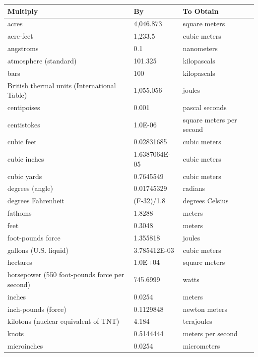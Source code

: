 \documentclass{fidata-report-template}
\begin{document}
{\footnotesize\sffamily\centering
  \begin{longtable}{||l|l|l||}
    \hline\hline
    \bfseries Multiply & \bfseries By & \bfseries To Obtain\\
    \hline\hline
    \endhead
    \hline\hline
    \endfoot
    acres & 4,046.873 & square meters\\
    \hline
    acre-feet & 1,233.5 & cubic meters\\
    \hline
    angstroms & 0.1 & nanometers\\
    \hline
    atmosphere (standard) & 101.325 & kilopascals\\
    \hline
    bars & 100 & kilopascals\\
    \hline
    British thermal units (International Table) & 1,055.056 & joules\\
    \hline
    centipoises & 0.001 & pascal seconds\\
    \hline
    centistokes & 1.0E-06 & square meters per second\\
    \hline
    cubic feet & 0.02831685 & cubic meters\\
    \hline
    cubic inches & 1.6387064E-05 & cubic meters\\
    \hline
    cubic yards & 0.7645549 & cubic meters\\
    \hline
    degrees (angle) & 0.01745329 & radians\\
    \hline
    degrees Fahrenheit & (F-32)/1.8 & degrees Celsius\\
    \hline
    fathoms & 1.8288 & meters\\
    \hline
    feet & 0.3048 & meters\\
    \hline
    foot-pounds force & 1.355818 & joules\\
    \hline
    gallons (U.S. liquid) & 3.785412E-03 & cubic meters\\
    \hline
    hectares & 1.0E+04 & square meters\\
    \hline
    horsepower (550 foot-pounds force per second) & 745.6999 & watts\\
    \hline
    inches & 0.0254 & meters\\
    \hline
    inch-pounds (force) & 0.1129848 & newton meters\\
    \hline
    kilotons (nuclear equivalent of TNT) & 4.184 & terajoules\\
    \hline
    knots & 0.5144444 & meters per second\\
    \hline
    microinches & 0.0254 & micrometers\\

\end{longtable}}
\end{document}
